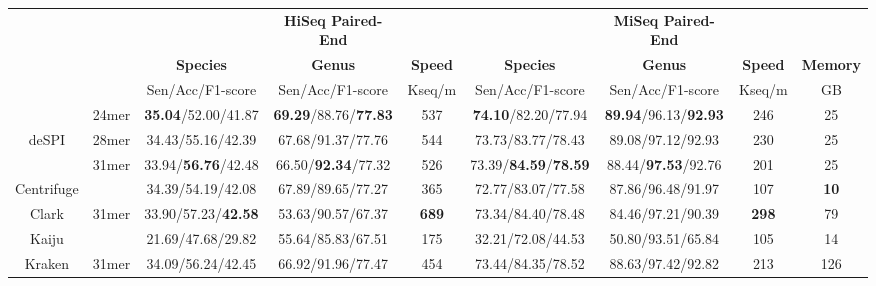 \documentclass[a0,portrait, svgnames]{a0poster}
\begin{document}
\begin{multicols}{2}
\begin{center}\vspace{1cm}
\footnotesize
\begin{tabular}{ccccc|ccc|c}
\toprule
& & & \textbf{HiSeq Paired-End} & && \textbf{MiSeq Paired-End} & & \\
& & \textbf{Species} & \textbf{Genus} & \textbf{Speed} & \textbf{Species} & \textbf{Genus} & \textbf{Speed} & \textbf{Memory}\\
\cline{3-5}\cline{6-9}
& & Sen/Acc/F1-score & Sen/Acc/F1-score & Kseq/m &Sen/Acc/F1-score & Sen/Acc/F1-score & Kseq/m & GB\\
\midrule
& 24mer & \textbf{35.04}/52.00/41.87 & \textbf{69.29}/88.76/\textbf{77.83} & 537 &\textbf{74.10}/82.20/77.94 & \textbf{89.94}/96.13/\textbf{92.93} & 246& 25\\
deSPI & 28mer & 34.43/55.16/42.39 & 67.68/91.37/77.76 & 544 &73.73/83.77/78.43 & 89.08/97.12/92.93 & 230 & 25\\
& 31mer & 33.94/\textbf{56.76}/42.48 & 66.50/\textbf{92.34}/77.32 & 526 & 73.39/\textbf{84.59}/\textbf{78.59} & 88.44/\textbf{97.53}/92.76 & 201 & 25\\
Centrifuge && 34.39/54.19/42.08 & 67.89/89.65/77.27 & 365 &72.77/83.07/77.58 & 87.86/96.48/91.97 & 107 & \textbf{10} \\
Clark & 31mer & 33.90/57.23/\textbf{42.58} & 53.63/90.57/67.37 & \textbf{689} & 73.34/84.40/78.48 & 84.46/97.21/90.39 & \textbf{298} & 79\\
Kaiju && 21.69/47.68/29.82 & 55.64/85.83/67.51 & 175  & 32.21/72.08/44.53 & 50.80/93.51/65.84 & 105 & 14\\
Kraken & 31mer & 34.09/56.24/42.45 & 66.92/91.96/77.47 & 454 & 73.44/84.35/78.52 & 88.63/97.42/92.82 & 213 & 126 \\
\bottomrule
\end{tabular}
\end{center}\vspace{1cm}


\end{multicols}
\end{document}
